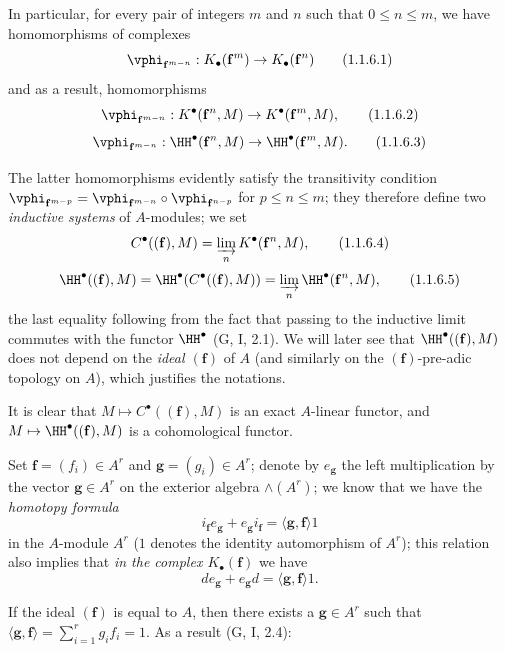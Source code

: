 \begin{env}[1.1.6]
\label{III.1.1.6}
In particular, for every pair of integers $m$ and $n$ such that $0\leq n\leq m$, we have homomorphisms of complexes
\[
  \vphi_{\mathbf{f}^{m-n}}:K_\bullet(\mathbf{f}^m)\to K_\bullet(\mathbf{f}^n)
  \tag{1.1.6.1}
\]
and as a result, homomorphisms
\[
  \vphi_{\mathbf{f}^{m-n}}:K^\bullet(\mathbf{f}^n,M)\to K^\bullet(\mathbf{f}^m,M),
  \tag{1.1.6.2}
\]
\[
  \vphi_{\mathbf{f}^{m-n}}:\HH^\bullet(\mathbf{f}^n,M)\to\HH^\bullet(\mathbf{f}^m,M).
  \tag{1.1.6.3}
\]

The latter homomorphisms evidently satisfy the transitivity condition $\vphi_{\mathbf{f}^{m-p}}=\vphi_{\mathbf{f}^{m-n}}\circ\vphi_{\mathbf{f}^{n-p}}$ for $p\leq n\leq m$; they therefore define two \emph{inductive systems} of $A$-modules; we set
\[
  C^\bullet((\mathbf{f}),M)=\varinjlim_n K^\bullet(\mathbf{f}^n,M),
  \tag{1.1.6.4}
\]
\[
  \HH^\bullet((\mathbf{f}),M)=\HH^\bullet(C^\bullet((\mathbf{f}),M))=\varinjlim_n\HH^\bullet(\mathbf{f}^n,M),
  \tag{1.1.6.5}
\]
the last equality following from the fact that passing to the inductive limit commutes with the functor $\HH^\bullet$ (G, I, 2.1).
We will later see  that $\HH^\bullet((\mathbf{f}),M)$ does not depend on the \emph{ideal $(\mathbf{f})$} of $A$ (and similarly on the $(\mathbf{f})$-pre-adic topology on $A$), which justifies the notations.

It is clear that $M\mapsto C^\bullet((\mathbf{f}),M)$ is an exact $A$-linear functor, and $M\mapsto\HH^\bullet((\mathbf{f}),M)$ is a cohomological functor.
\end{env}

\begin{env}[1.1.7]
\label{III.1.1.7}
Set $\mathbf{f}=(f_i)\in A^r$ and $\mathbf{g}=(g_i)\in A^r$; denote by $e_\mathbf{g}$ the left multiplication by the vector $\mathbf{g}\in A^r$ on the exterior algebra $\wedge(A^r)$; we know that we have the \emph{homotopy formula}
\[
  i_\mathbf{f}e_\mathbf{g}+e_\mathbf{g}i_\mathbf{f}=\langle\mathbf{g},\mathbf{f}\rangle 1
  \tag{1.1.7.1}
\]
in the $A$-module $A^r$ ($1$ denotes the identity automorphism of $A^r$); this relation also implies that \emph{in the complex $K_\bullet(\mathbf{f})$} we have
\[
  de_\mathbf{g}+e_\mathbf{g}d=\langle\mathbf{g},\mathbf{f}\rangle 1.
  \tag{1.1.7.2}
\]

If the ideal $(\mathbf{f})$ is equal to $A$, then there exists a $\mathbf{g}\in A^r$ such that $\langle\mathbf{g},\mathbf{f}\rangle=\sum_{i=1}^r g_i f_i=1$.
As a result (G, I, 2.4):
\end{env}

